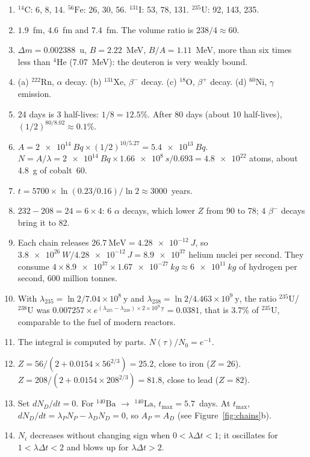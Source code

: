 \documentclass[11pt,a4paper]{article}
\newcommand{\iso}[2]{\ensuremath{{}^{#1}\mathrm{#2}}}         %
\begin{document}
\begin{enumerate}[label=\textbf{\arabic*.}]
  \item \iso{14}{C}: 6, 8, 14. \iso{56}{Fe}: 26, 30, 56. \iso{131}{I}: 53, 78, 131. \iso{235}{U}: 92, 143, 235.
  \item $1.9$~fm, $4.6$~fm and $7.4$~fm. The volume ratio is $238/4 \approx 60$.
  \item $\Delta m = 0.002388$~u, $B = 2.22$~MeV, $B/A = 1.11$~MeV, more than six times less than \iso{4}{He} (7.07~MeV): the deuteron is very weakly bound.
  \item (a) \iso{222}{Rn}, $\alpha$ decay. (b) \iso{131}{Xe}, $\beta^-$ decay. (c) \iso{18}{O}, $\beta^+$ decay. (d) \iso{60}{Ni}, $\gamma$ emission.
  \item 24 days is 3 half-lives: $1/8 = 12.5\%$. After 80 days (about 10 half-lives), $(1/2)^{80/8.02} \approx 0.1\%$.
  \item $A = \SI{2e14}{Bq} \times (1/2)^{10/5.27} = \SI{5.4e13}{Bq}$. $N = A/\lambda = \SI{2e14}{Bq} \times \SI{1.66e8}{s}/0.693 = \num{4.8e22}$ atoms, about 4.8~g of cobalt~60.
  \item $t = 5700 \times \ln(0.23/0.16)/\ln 2 \approx 3000$~years.
  \item $232 - 208 = 24 = 6 \times 4$: 6 $\alpha$ decays, which lower $Z$ from 90 to 78; 4 $\beta^-$ decays bring it to 82.
  \item Each chain releases $26.7~\text{MeV} = \SI{4.28e-12}{J}$, so $\SI{3.8e26}{W}/\SI{4.28e-12}{J} = \num{8.9e37}$ helium nuclei per second. They consume $4 \times \num{8.9e37} \times \SI{1.67e-27}{kg} \approx \SI{6e11}{kg}$ of hydrogen per second, 600 million tonnes.
  \item With $\lambda_{235} = \ln 2 / 7.04\times10^8~\text{y}$ and $\lambda_{238} = \ln 2 / 4.463\times10^9~\text{y}$, the ratio \iso{235}{U}/\iso{238}{U} was $0.007257 \times e^{(\lambda_{235}-\lambda_{238}) \times 2\times10^9~\text{y}} = 0.0381$, that is $3.7\%$ of \iso{235}{U}, comparable to the fuel of modern reactors.
  \item The integral is computed by parts. $N(\tau)/N_0 = e^{-1}$.
  \item $Z = 56/(2 + 0.0154 \times 56^{2/3}) = 25.2$, close to iron ($Z = 26$). $Z = 208/(2 + 0.0154 \times 208^{2/3}) = 81.8$, close to lead ($Z = 82$).
  \item Set $dN_D/dt = 0$. For \iso{140}{Ba} $\to$ \iso{140}{La}, $t_{\max} = 5.7$~days. At $t_{\max}$, $dN_D/dt = \lambda_P N_P - \lambda_D N_D = 0$, so $A_P = A_D$ (see Figure~\ref{fig:chains}b).
  \item $N_i$ decreases without changing sign when $0 < \lambda \Delta t < 1$; it oscillates for $1 < \lambda\Delta t < 2$ and blows up for $\lambda\Delta t > 2$.
\end{enumerate}
\end{document}
